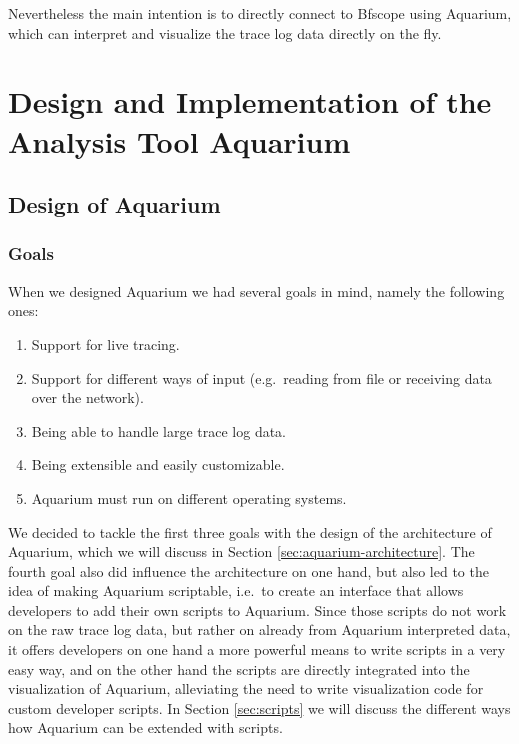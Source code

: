 \documentclass[a4paper,11pt,twoside]{report}
\begin{document}
Nevertheless the main intention is to directly connect to Bfscope using
Aquarium, which can interpret and visualize the trace log data directly on the
fly.

\chapter{Design and Implementation of the Analysis Tool Aquarium\label{sec:aquarium}}

\section{Design of Aquarium}

\subsection{Goals}

When we designed Aquarium we had several goals in mind, namely the following
ones:

\begin{enumerate}
	\item Support for live tracing.
	\item Support for different ways of input (e.g.~reading from file or
		receiving data over the network).
	\item Being able to handle large trace log data.
	\item Being extensible and easily customizable.
	\item Aquarium must run on different operating systems.
\end{enumerate}

We decided to tackle the first three goals with the design of the architecture
of Aquarium, which we will discuss in Section \ref{sec:aquarium-architecture}.
The fourth goal also did influence the architecture on one hand, but also
led to the idea of making Aquarium scriptable, i.e.~to create an interface that
allows developers to add their own scripts to Aquarium. Since those scripts do
not work on the raw trace log data, but rather on already from Aquarium
interpreted data, it offers developers on one hand a more powerful means to
write scripts in a very easy way, and on the other hand the scripts are directly
integrated into the visualization of Aquarium, alleviating the need to write
visualization code for custom developer scripts. In Section \ref{sec:scripts} we
will discuss the different ways how Aquarium can be extended with scripts.
\end{document}
